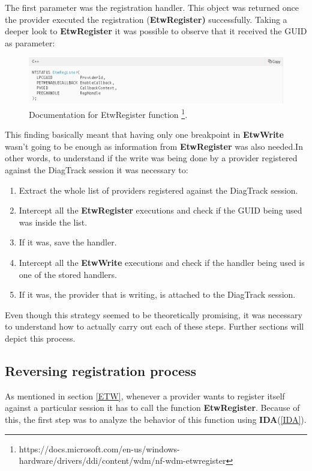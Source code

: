 The first parameter was the registration handler. This object was returned once the provider executed the registration ({\bfseries EtwRegister)} successfully.
Taking a deeper look to {\bfseries EtwRegister} it was possible to observe that it received the GUID as parameter:
\begin{figure}[H]
  \includegraphics[width=\linewidth]{images/etw_register_docu.png}
  \caption[]{Documentation for EtwRegister function \footnote{https://docs.microsoft.com/en-us/windows-hardware/drivers/ddi/content/wdm/nf-wdm-etwregister}.}
  \label{fig:etw_register_docu}
\end{figure}

This finding basically meant that having only one breakpoint in {\bfseries EtwWrite} wasn't going to be enough as information from {\bfseries EtwRegister} was also needed.In other words, to understand if the write was being done by a provider registered against the DiagTrack session it was necessary to: 
\begin{enumerate}
\setlength\itemsep{0.05em}
    \item Extract the whole list of providers registered against the DiagTrack session.
    \item Intercept all the {\bfseries EtwRegister} executions and check if the GUID being used was inside the list.
    \item If it was, save the handler. 
    \item Intercept all the {\bfseries EtwWrite} executions and check if the handler being used is one of the stored handlers.
    \item If it was, the provider that is writing, is attached to the DiagTrack session.
\end{enumerate}

Even though this strategy seemed to be theoretically promising, it was necessary to understand how to actually carry out each of these steps. Further sections will depict this process.






\subsection{Reversing registration process}\label{reversing_registration_process}
As mentioned in section \ref{ETW}, whenever a provider wants to register itself against a particular session it has to call the function {\bfseries EtwRegister}. Because of this, the first step was to analyze the behavior of this function using {\bfseries IDA}(\ref{IDA}). 

